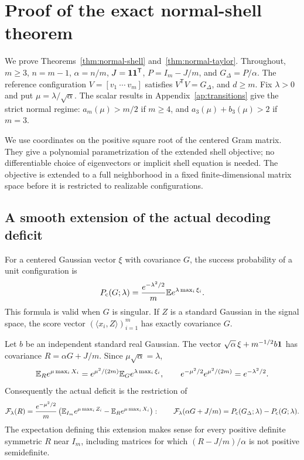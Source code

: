 \section{Proof of the exact normal-shell theorem}\label{ap:normal}

We prove Theorems~\ref{thm:normal-shell} and~\ref{thm:normal-taylor}.
Throughout, $m\ge3$, $n=m-1$, $\alpha=n/m$,
$J=\mathbf 1\mathbf 1^{\mathsf T}$, $P=I_m-J/m$, and $G_\Delta=P/\alpha$.
The reference configuration $V=[v_1\ \cdots\ v_m]$ satisfies
$V^{\mathsf T}V=G_\Delta$, and $d\ge m$.
Fix $\lambda>0$ and put $\mu=\lambda/\sqrt\alpha$.
The scalar results in Appendix~\ref{ap:transitions} give the strict normal
regime: $a_m(\mu)>m/2$ if $m\ge4$, and
$a_3(\mu)+b_3(\mu)>2$ if $m=3$.

We use coordinates on the positive square root of the centered Gram matrix.
They give a polynomial parametrization of the extended shell objective;
no differentiable choice of eigenvectors or implicit shell equation is needed.
The objective is extended to a full neighborhood in a fixed finite-dimensional
matrix space before it is restricted to realizable configurations.

\subsection{A smooth extension of the actual decoding deficit}\label{ng:smooth}

For a centered Gaussian vector $\xi$ with covariance $G$, the success
probability of a unit configuration is
\begin{equation}\label{ng:pc}
 P_{\mathrm c}(G;\lambda)=\frac{e^{-\lambda^2/2}}m
                 \mathbb E e^{\lambda\max_i\xi_i}.
\end{equation}
This formula is valid when $G$ is singular. If $Z$ is a standard Gaussian
in the signal space, the score vector
$(\langle x_i,Z\rangle)_{i=1}^m$ has exactly covariance $G$.

Let $b$ be an independent standard real Gaussian. The vector
$\sqrt\alpha\,\xi+m^{-1/2}b\mathbf 1$ has covariance
$R=\alpha G+J/m$. Since $\mu\sqrt\alpha=\lambda$,
\[
 \mathbb E_R e^{\mu\max_i X_i}
   =e^{\mu^2/(2m)}\mathbb E_G e^{\lambda\max_i\xi_i},
 \qquad
 e^{-\mu^2/2}e^{\mu^2/(2m)}=e^{-\lambda^2/2}.
\]
Consequently the actual deficit is the restriction of
\begin{equation}\label{ng:extended-loss}
 \mathcal F_\lambda(R)=
 \frac{e^{-\mu^2/2}}m
 \left(\mathbb E_{I_m}e^{\mu\max_i Z_i}
             -\mathbb E_R e^{\mu\max_i X_i}\right):
 \qquad
 \mathcal F_\lambda(\alpha G+J/m)
   =P_{\mathrm c}(G_\Delta;\lambda)-P_{\mathrm c}(G;\lambda).
\end{equation}
The expectation defining this extension makes sense for every positive
definite symmetric $R$ near $I_m$, including matrices for which
$(R-J/m)/\alpha$ is not positive semidefinite.

